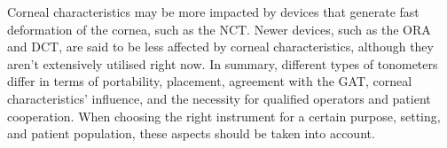 \documentclass[12pt]{article}
\begin{document}
Corneal characteristics may be more impacted by devices that generate fast deformation of the cornea, such as the NCT. Newer devices, such as the ORA and DCT, are said to be less affected by corneal characteristics, although they aren't extensively utilised right now. In summary, different types of tonometers differ in terms of portability, placement, agreement with the GAT, corneal characteristics' influence, and the necessity for qualified operators and patient cooperation. When choosing the right instrument for a certain purpose, setting, and patient population, these aspects should be taken into account.
\end{document}
